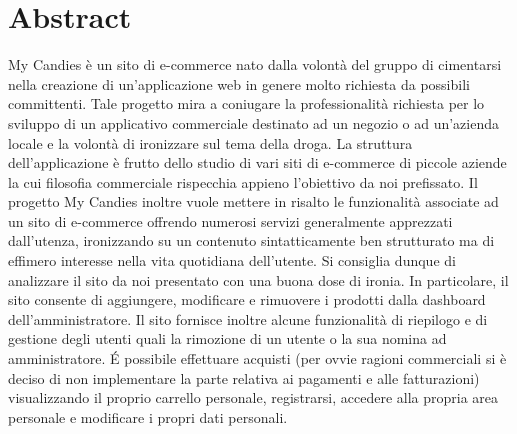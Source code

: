 \section{Abstract} 
My Candies è un sito di e-commerce nato dalla volontà del gruppo di cimentarsi nella creazione di un'applicazione web in genere molto richiesta da possibili committenti. 
Tale progetto mira a coniugare la professionalità richiesta per lo sviluppo di un applicativo commerciale destinato ad un negozio o ad un'azienda locale e la volontà di ironizzare sul tema della droga.
La struttura dell'applicazione è frutto dello studio di vari siti di e-commerce  di piccole aziende  la cui filosofia commerciale rispecchia appieno l'obiettivo da noi prefissato. 
Il progetto My Candies inoltre vuole mettere in risalto le funzionalità associate ad un sito di e-commerce offrendo numerosi servizi generalmente apprezzati dall'utenza, ironizzando su un contenuto sintatticamente ben strutturato ma di effimero interesse nella vita quotidiana dell'utente. Si consiglia dunque di analizzare il sito da noi presentato con una buona dose di ironia. In particolare, il sito consente di aggiungere, modificare e rimuovere i prodotti dalla dashboard dell'amministratore. Il sito fornisce inoltre alcune funzionalità di riepilogo e di gestione degli utenti quali la rimozione di un utente o la sua nomina ad amministratore. \'E possibile effettuare acquisti (per ovvie ragioni commerciali si è deciso di non implementare la parte relativa ai pagamenti e alle fatturazioni) visualizzando il proprio carrello personale, registrarsi, accedere alla propria area personale e modificare i propri dati personali.